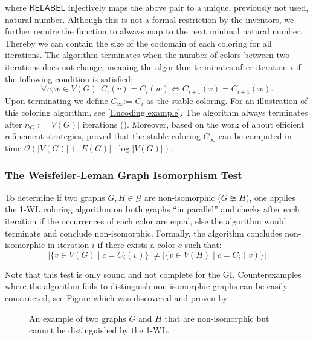 \documentclass[11pt, dvipsnames, DIV=12]{scrreprt}
\theoremstyle{definition}
\begin{document}
\noindent where $\textsf{RELABEL}$ injectively maps the above pair to a unique, previously not used, natural number. Although this is not a formal restriction by the inventors, we further require the function to always map to the next minimal natural number. Thereby we can contain the size of the codomain of each coloring for all iterations. The algorithm terminates when the number of colors between two iterations does not change, meaning the algorithm terminates after iteration $i$ if the following condition is satisfied:
\begin{equation*}
\forall v,w \in V(G):  C_i(v) = C_i(w) \iff C_{i+1}(v) = C_{i+1}(w).
\end{equation*}
Upon terminating we define $C_{\infty}$:= $C_i$ as the stable coloring. For an illustration of this coloring algorithm, see \autoref{Encoding example}. The algorithm always terminates after $n_G:= |V(G)|$ iterations (\cite{Gro2017}). Moreover, based on the work of \cite{Pai+87} about efficient refinement strategies, \cite{Car+82} proved that the stable coloring $C_\infty$ can be computed in time $\mathcal{O}(| V(G) | + |E(G)| \cdot \log | V(G) |)$.

\subsubsection{The Weisfeiler-Leman Graph Isomorphism Test}
To determine if two graphs $G, H \in \mathcal{G}$ are non-isomorphic ($G \ncong H)$, one applies the 1-WL coloring algorithm on both graphs ``in parallel'' and checks after each iteration if the occurrences of each color are equal, else the algorithm would terminate and conclude non-isomorphic. Formally, the algorithm concludes non-isomorphic in iteration $i$ if there exists a color $c$ such that: 
\begin{equation*}
    |\{ v \in V(G) \mid c = C_i(v)\} | \neq |\{ v \in V(H) \mid c = C_i(v)\} |
\end{equation*}

Note that this test is only sound and not complete for the \textsc{GI}. Counterexamples where the algorithm fails to distinguish non-isomorphic graphs can be easily constructed, see Figure  which was discovered and proven by \cite{Cai1992}.

\begin{figure}[H]
    \centering
    
    \caption{An example of two graphs $G$ and $H$ that are non-isomorphic but cannot be distinguished by the 1-WL.}
    \label{1-WL Counter Example}
\end{figure}
\end{document}
